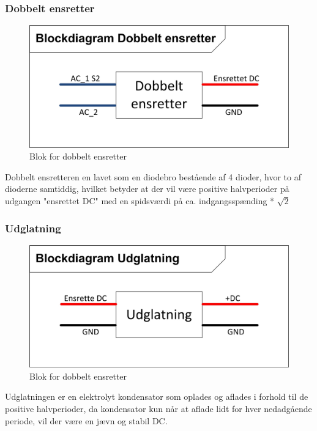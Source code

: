 \subsubsection{Dobbelt ensretter}
\begin{figure}[H]
\centering
\includegraphics[scale=1]{billeder/DobbeltensretterBlok}
\caption{Blok for dobbelt ensretter}
\label{fig:DobbeltensretterBlok1}
\end{figure}
Dobbelt ensretteren en lavet som en diodebro bestående af 4 dioder, hvor to af dioderne samtiddig, hvilket betyder at der vil være positive halvperioder på udgangen "ensrettet DC" med en spidsværdi på ca. indgangsspænding * $\sqrt{2}$
\subsubsection{Udglatning}
\begin{figure}[H]
\centering
\includegraphics[scale=1]{billeder/UdglatningsBlok}
\caption{Blok for dobbelt ensretter}
\label{fig:DobbeltensretterBlok2}
\end{figure}
Udglatningen er en elektrolyt kondensator som oplades og aflades i forhold til de positive halvperioder, da kondensator kun når at aflade lidt for hver nedadgående periode, vil der være en jævn og stabil DC.  
